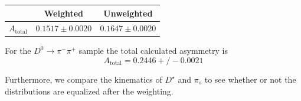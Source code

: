 \documentclass{article}
\begin{document}
    \begin{center}
        \begin{tabular}{c|c|c}
             & Weighted & Unweighted\\
             \hline\hline
            $A_{\text{total}}$ & $0.1517 \pm 0.0020$ & $0.1647 \pm 0.0020$\\
        \end{tabular}
    \end{center}

    For the $D^0\to \pi^-\pi^+$ sample the total calculated asymmetry is
    \begin{equation}
        A_{\text{total}} = 0.2446 +/- 0.0021
    \end{equation}

    Furthermore, we compare the kinematics of $D^\star$ and $\pi_s$ to see whether or not the distributions are equalized after the weighting.
\end{document}
